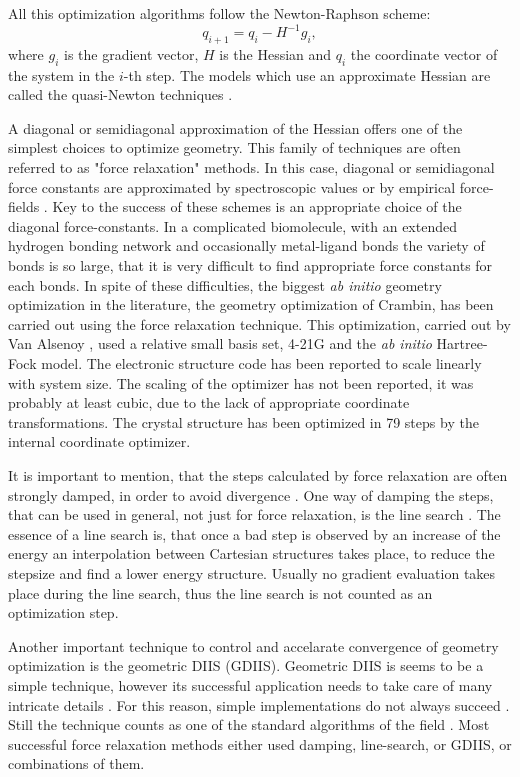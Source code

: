 \documentclass[prl,twocolumn,showpacs,twocolumngrid,superbib]{revtex4}
\begin{document}
All this optimization algorithms follow the Newton-Raphson scheme:
\begin{equation}
q_{i+1} = q_{i} - H^{-1} g_{i} ,
\end{equation}
where $g_{i}$ is the gradient vector, $H$ is the Hessian and
$q_{i}$ the coordinate vector of the system in the $i$-th step.
The models which use an approximate Hessian are called the
quasi-Newton techniques \cite{RFletcher}. 

A diagonal or semidiagonal approximation of the Hessian offers one
of the simplest choices to optimize geometry.
This family of techniques are often referred to as "force relaxation" 
methods.
In this case, diagonal or semidiagonal force constants are approximated
by spectroscopic values or by empirical force-fields \cite{pulay_69,pulay_review,sellers,fogarasi_diaghess,Pulay_natural_internals,van_alsenoy_98,lindh}.
Key to the success of these schemes is an appropriate choice of the
diagonal force-constants. In a complicated biomolecule, with 
an extended hydrogen bonding network and occasionally metal-ligand bonds the
variety of bonds is so large, that it is very difficult to find appropriate
force constants for each bonds. In spite of these difficulties, the biggest
{\it ab initio} geometry optimization in the literature, the geometry 
optimization of Crambin, has been carried out using the force 
relaxation technique. This optimization,
carried out by Van Alsenoy \cite{van_alsenoy_98}, used a 
relative small basis set, 4-21G and the {\it ab initio} Hartree-Fock model.
The electronic structure code has been reported to scale linearly with 
system size. The scaling of the optimizer has not been reported, it was
probably at least cubic, due to the lack of appropriate coordinate 
transformations. The crystal structure has been optimized in 79 steps
by the internal coordinate optimizer.

It is important to mention, that the steps calculated by 
force relaxation are often strongly damped, in order to avoid divergence
\cite{sellers}. One way of damping the steps, that can be used in general,
not just for force relaxation, is the line search \cite{sclegel_linesearch}.
The essence of a line search is, that once a bad step is observed by an 
increase of the energy an interpolation between Cartesian structures takes 
place, to reduce the stepsize and find a lower energy structure. 
Usually no gradient evaluation takes place during the line search, thus
the line search is not counted as an optimization step.

Another important technique to control and accelarate convergence of geometry
optimization is the geometric DIIS \cite{Pulay_GDIIS} (GDIIS). Geometric DIIS is
seems to be a simple technique, however its successful application needs
to take care of many intricate details \cite{Farkas_GDIIS}.
For this reason, simple implementations do not always succeed \cite{bakken}.
Still the technique counts as one of the standard algorithms of the field
\cite{fogarasi_diaghess,Pulay_natural_internals,eckert,Farkas_GDIIS}.
Most successful force relaxation methods either used damping, line-search,
or GDIIS, or combinations of them. 
\end{document}
